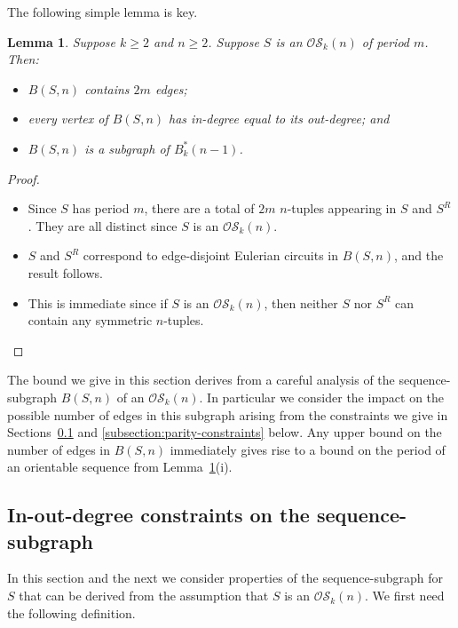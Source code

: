 \documentclass[a4paper,11pt]{article}
\newtheorem{lemma}{Lemma}[section]
\begin{document}
The following simple lemma is key.

\begin{lemma}  \label{lemma:BSn_basic_properties}
Suppose $k\geq2$ and $n\geq2$.  Suppose $S$ is an $\mathcal{OS}_k(n)$ of period $m$.  Then:
\begin{itemize}
\item[i)] $B(S,n)$ contains $2m$ edges;
\item[ii)] every vertex of $B(S,n)$ has in-degree equal to its out-degree; and
\item[iii)] $B(S,n)$ is a subgraph of $B^*_k(n-1)$.
\end{itemize}
\end{lemma}

\begin{proof}
\begin{itemize}
\item[i)] Since $S$ has period $m$, there are a total of $2m$ $n$-tuples appearing in $S$ and
    $S^R$.  They are all distinct since $S$ is an $\mathcal{OS}_k(n)$.
\item[ii)] $S$ and $S^R$ correspond to edge-disjoint Eulerian circuits in $B(S,n)$, and the
    result follows.
\item[iii)] This is immediate since if $S$ is an $\mathcal{OS}_k(n)$, then neither $S$ nor
    $S^R$ can contain any symmetric $n$-tuples.
\end{itemize}
\end{proof}

The bound we give in this section derives from a careful analysis of the sequence-subgraph $B(S,n)$
of an $\mathcal{OS}_k(n)$.  In particular we consider the impact on the possible number of edges in
this subgraph arising from the constraints we give in Sections~\ref{subsection:in-out-constraints}
and \ref{subsection:parity-constraints} below. Any upper bound on the number of edges in $B(S,n)$
immediately gives rise to a bound on the period of an orientable sequence from
Lemma~\ref{lemma:BSn_basic_properties}(i).


\subsection{In-out-degree constraints on the sequence-subgraph}  \label{subsection:in-out-constraints}

In this section and the next we consider properties of the sequence-subgraph for $S$ that can be
derived from the assumption that $S$ is an $\mathcal{OS}_k(n)$.  We first need the following
definition.
\end{document}
